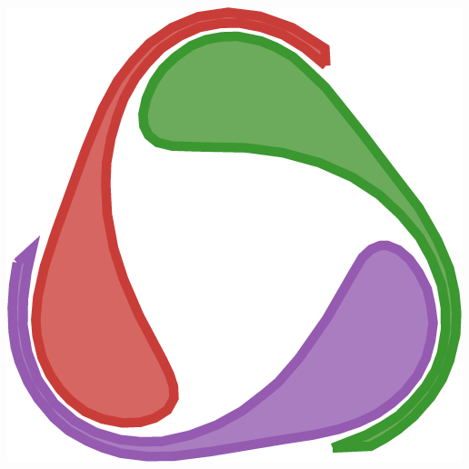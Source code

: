 \documentclass{beamer}
\begin{document}
{\begin{frame}
  \includegraphics[height=0.15\textheight]{diffeq}

\end{frame}
}
\end{document}
